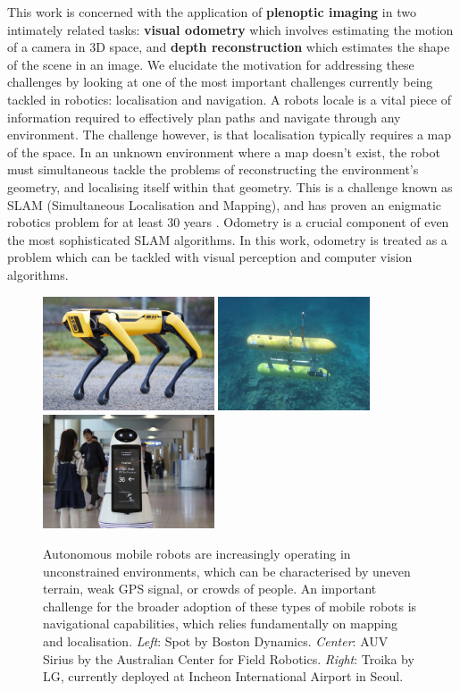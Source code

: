 This work is concerned with the application of \textbf{plenoptic imaging} in two intimately related tasks: \textbf{visual odometry} which involves estimating the motion of a camera in 3D space, and \textbf{depth reconstruction} which estimates the shape of the scene in an image. We elucidate the motivation for addressing these challenges by looking at one of the most important challenges currently being tackled in robotics: localisation and navigation. A robots locale is a vital piece of information required to effectively plan paths and navigate through any environment. The challenge however, is that localisation typically requires a map of the space. In an unknown environment where a map doesn't exist, the robot must simultaneous tackle the problems of reconstructing the environment's geometry, and localising itself within that geometry. This is a challenge known as SLAM (Simultaneous Localisation and Mapping), and has proven an enigmatic robotics problem for at least 30 years \cite{cadena2016slam, kuehefuss2016rgbdslam}. Odometry is a crucial component of even the most sophisticated SLAM algorithms. In this work, odometry is treated as a problem which can be tackled with visual perception and computer vision algorithms. 

\begin{figure}[htbp]
    \includegraphics[height=1.33in]{images/spot.jpg}
    \includegraphics[height=1.33in]{images/rov_sirius.jpg}
    \includegraphics[height=1.33in]{images/troika.jpg}
    \caption[Examples of robots that operate in unconstrained spaces.]{Autonomous mobile robots are increasingly operating in unconstrained environments, which can be characterised by uneven terrain, weak GPS signal, or crowds of people. An important challenge for the broader adoption of these types of mobile robots is navigational capabilities, which relies fundamentally on mapping and localisation. \textit{Left}: Spot by Boston Dynamics. \textit{Center}: AUV Sirius by the Australian Center for Field Robotics. \textit{Right}: Troika by LG, currently deployed at Incheon International Airport in Seoul.}
\end{figure}


